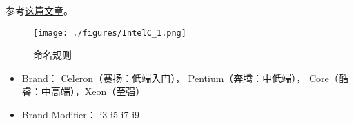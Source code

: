 
\begin{issues}
\issueDraft
\end{issues}

参考\href{https://www.itechtics.com/processor-generations/}{这篇文章}。

\begin{figure}[ht]
\centering
\texttt{[image: ./figures/IntelC\_1.png]}
\caption{命名规则} \label{IntelC_fig1}
\end{figure}

\begin{itemize}
\item Brand： Celeron（赛扬：低端入门）， Pentium（奔腾：中低端）， Core（酷睿：中高端），Xeon（至强）
\item Brand Modifier： i3 i5 i7 i9
\end{itemize}
